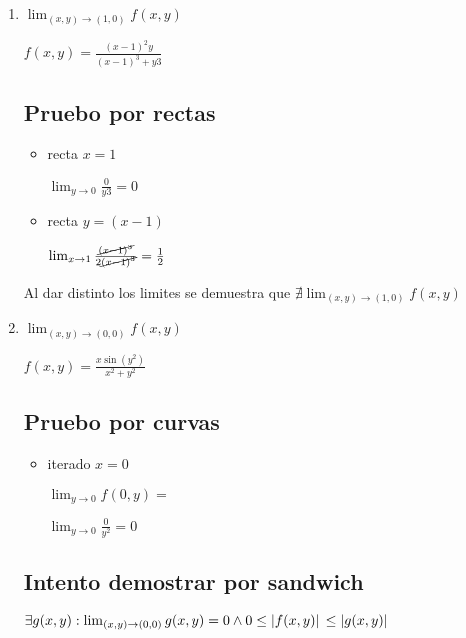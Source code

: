 \documentclass[../parcial.tex]{subfiles}
\begin{document}
    \begin{enumerate}
        \item $ \lim_{(x,y) \to (1,0)} f(x,y) $

            $f(x,y) = \frac{(x-1)^2y}{(x-1)^3+y3}$

        \subsection*{Pruebo por rectas}

        \begin{itemize}
            \item recta $x = 1$
            
                $\lim_{y\to0} \frac{0}{y3} = 0 $

            \item recta $y = (x-1)$
            
                $\lim_{x\to1} \frac{\cancel{(x-1)^3}}{2\cancel{(x-1)^3}} = \frac{1}{2}$

        \end{itemize}

        Al dar distinto los limites se demuestra que $\nexists \lim_{(x,y)\to(1,0)} f(x,y) $

        \item $ \lim_{(x,y) \to (0,0)} f(x,y) $
        
            $f(x,y) = \frac{x\sin(y^2)}{x^2+y^2}$

            \subsection*{Pruebo por curvas}

            \begin{itemize}
                \item iterado $ x = 0$

                    $\lim_{y\to0} f(0,y) = $

                    $\lim_{y\to0} \frac{0}{y^2} = 0$

            \end{itemize}

            \subsection*{Intento demostrar por sandwich}
        
            $ \exists g(x,y): \lim_{(x,y)\to(0,0)} g(x,y) = 0 \wedge 0 \leq \abs*{f(x,y)} \leq \abs*{g(x,y)} $


\end{enumerate}
\end{document}
